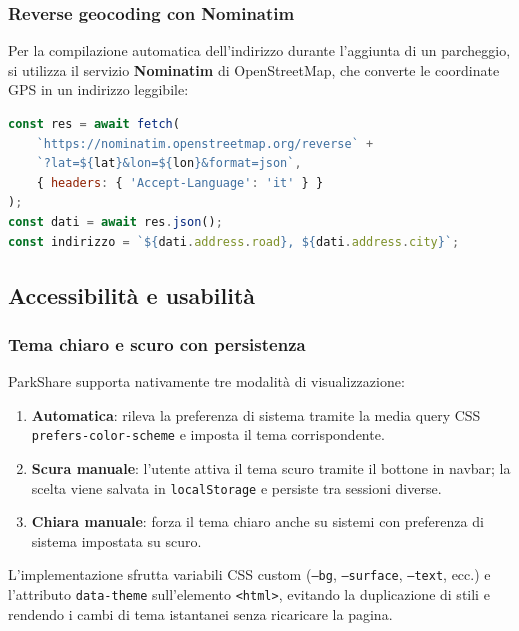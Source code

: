 \documentclass[12pt, a4paper]{article}
\begin{document}
\subsubsection{Reverse geocoding con Nominatim}

Per la compilazione automatica dell'indirizzo durante l'aggiunta di un parcheggio,
si utilizza il servizio \textbf{Nominatim} di OpenStreetMap, che converte le
coordinate GPS in un indirizzo leggibile:

\begin{lstlisting}[language=JavaScript, caption={Chiamata a Nominatim per il reverse geocoding.}]
const res = await fetch(
    `https://nominatim.openstreetmap.org/reverse` +
    `?lat=${lat}&lon=${lon}&format=json`,
    { headers: { 'Accept-Language': 'it' } }
);
const dati = await res.json();
const indirizzo = `${dati.address.road}, ${dati.address.city}`;
\end{lstlisting}

\subsection{Accessibilità e usabilità}

\subsubsection{Tema chiaro e scuro con persistenza}

ParkShare supporta nativamente tre modalità di visualizzazione:

\begin{enumerate}
    \item \textbf{Automatica}: rileva la preferenza di sistema tramite la media
    query CSS \texttt{prefers-color-scheme} e imposta il tema corrispondente.
    \item \textbf{Scura manuale}: l'utente attiva il tema scuro tramite il bottone in navbar; la scelta viene salvata in \texttt{localStorage} e persiste
    tra sessioni diverse.
    \item \textbf{Chiara manuale}: forza il tema chiaro anche su sistemi con
    preferenza di sistema impostata su scuro.
\end{enumerate}

L'implementazione sfrutta variabili CSS custom (\texttt{--bg}, \texttt{--surface},
\texttt{--text}, ecc.) e l'attributo \texttt{data-theme} sull'elemento
\texttt{<html>}, evitando la duplicazione di stili e rendendo i cambi di tema
istantanei senza ricaricare la pagina.
\end{document}
